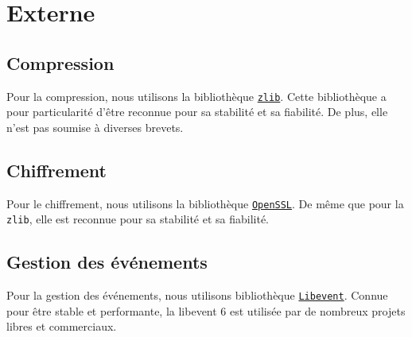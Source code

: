 \section{Externe}
\subsection{Compression}
Pour la compression, nous utilisons la bibliothèque \href{http://zlib.net/}{\texttt{zlib}}.
Cette bibliothèque a pour particularité d'être reconnue pour sa stabilité et sa fiabilité.
De plus, elle n'est pas soumise à diverses brevets.

\subsection{Chiffrement}
Pour le chiffrement, nous utilisons la bibliothèque \href{http://www.openssl.org/}{\texttt{OpenSSL}}.
De même que pour la \texttt{zlib}, elle est reconnue pour sa stabilité et sa fiabilité.


\subsection{Gestion des événements}
Pour la gestion des événements, nous utilisons bibliothèque \href{http://libevent.org/}{\texttt{Libevent}}.
Connue pour être stable et performante, la libevent 6 est utilisée
par de nombreux projets libres et commerciaux.
